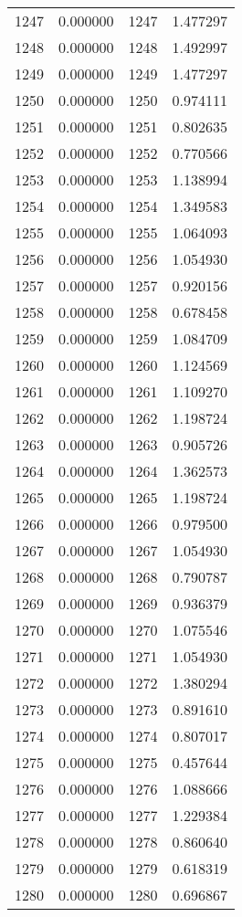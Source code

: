 \documentclass[12pt]{article}
\begin{document}
\begin{longtable}{@{}cccc@{}}
1247 & 0.000000 & 1247 & 1.477297 \\
1248 & 0.000000 & 1248 & 1.492997 \\
1249 & 0.000000 & 1249 & 1.477297 \\
1250 & 0.000000 & 1250 & 0.974111 \\
1251 & 0.000000 & 1251 & 0.802635 \\
1252 & 0.000000 & 1252 & 0.770566 \\
1253 & 0.000000 & 1253 & 1.138994 \\
1254 & 0.000000 & 1254 & 1.349583 \\
1255 & 0.000000 & 1255 & 1.064093 \\
1256 & 0.000000 & 1256 & 1.054930 \\
1257 & 0.000000 & 1257 & 0.920156 \\
1258 & 0.000000 & 1258 & 0.678458 \\
1259 & 0.000000 & 1259 & 1.084709 \\
1260 & 0.000000 & 1260 & 1.124569 \\
1261 & 0.000000 & 1261 & 1.109270 \\
1262 & 0.000000 & 1262 & 1.198724 \\
1263 & 0.000000 & 1263 & 0.905726 \\
1264 & 0.000000 & 1264 & 1.362573 \\
1265 & 0.000000 & 1265 & 1.198724 \\
1266 & 0.000000 & 1266 & 0.979500 \\
1267 & 0.000000 & 1267 & 1.054930 \\
1268 & 0.000000 & 1268 & 0.790787 \\
1269 & 0.000000 & 1269 & 0.936379 \\
1270 & 0.000000 & 1270 & 1.075546 \\
1271 & 0.000000 & 1271 & 1.054930 \\
1272 & 0.000000 & 1272 & 1.380294 \\
1273 & 0.000000 & 1273 & 0.891610 \\
1274 & 0.000000 & 1274 & 0.807017 \\
1275 & 0.000000 & 1275 & 0.457644 \\
1276 & 0.000000 & 1276 & 1.088666 \\
1277 & 0.000000 & 1277 & 1.229384 \\
1278 & 0.000000 & 1278 & 0.860640 \\
1279 & 0.000000 & 1279 & 0.618319 \\
1280 & 0.000000 & 1280 & 0.696867 \\

\end{longtable}
\end{document}
